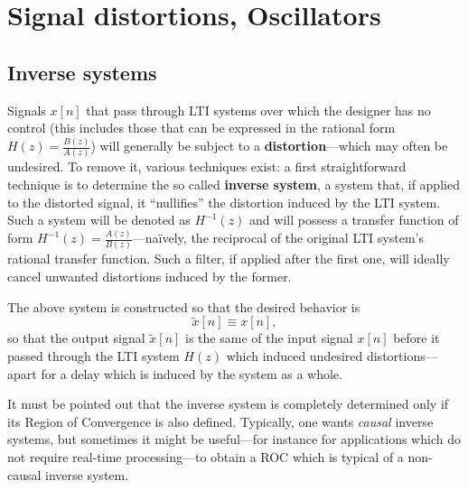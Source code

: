\documentclass[\documentfontsize, twocolumn]{\classname}
\begin{document}
\clearpage

\chapter{Signal distortions, Oscillators}

\section{Inverse systems}
Signals $x[n]$ that pass through LTI systems over which the designer has no control (this includes those that can be expressed in the rational form $H(z) = \frac{B(z)}{A(z)}$) will generally be subject to a \textbf{distortion}---which may often be undesired. To remove it, various techniques exist: a first straightforward technique is to determine the so called \textbf{inverse system}, a system that, if applied to the distorted signal, it ``nullifies'' the distortion induced by the LTI system. Such a system will be denoted as $H^{-1}(z)$ and will possess a transfer function of form $H^{-1}(z) = \frac{A(z)}{B(z)}$---na\"ively, the reciprocal of the original LTI system's rational transfer function. Such a filter, if applied after the first one, will ideally cancel unwanted distortions induced by the former.

\begin{center}
\end{center}

The above system is constructed so that the desired behavior is 
\[
    \tilde{x}[n] \equiv x[n],
\]
so that the output signal $\tilde{x}[n]$ is the same of the input signal $x[n]$ before it passed through the LTI system $H(z)$ which induced undesired distortions---apart for a delay which is induced by the system as a whole.

It must be pointed out that the inverse system is completely determined only if its Region of Convergence is also defined. Typically, one wants \emph{causal} inverse systems, but sometimes it might be useful---for instance for applications which do not require real-time processing---to obtain a ROC which is typical of a non-causal inverse system.
\end{document}
